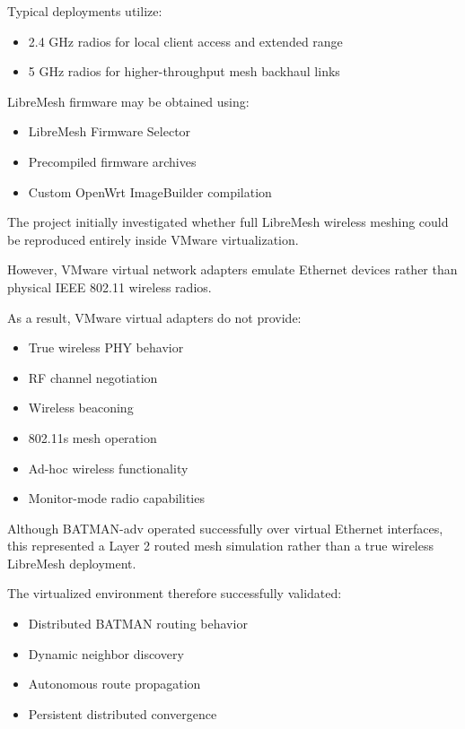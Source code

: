 \documentclass[conference]{IEEEtran}
\begin{document}
Typical deployments utilize:

\begin{itemize}
    \item 2.4 GHz radios for local client access and extended range
    \item 5 GHz radios for higher-throughput mesh backhaul links
\end{itemize}

LibreMesh firmware may be obtained using:

\begin{itemize}
    \item LibreMesh Firmware Selector
    \item Precompiled firmware archives
    \item Custom OpenWrt ImageBuilder compilation
\end{itemize}

The project initially investigated whether full LibreMesh wireless meshing could be reproduced entirely inside VMware virtualization.

However, VMware virtual network adapters emulate Ethernet devices rather than physical IEEE 802.11 wireless radios.

As a result, VMware virtual adapters do not provide:

\begin{itemize}
    \item True wireless PHY behavior
    \item RF channel negotiation
    \item Wireless beaconing
    \item 802.11s mesh operation
    \item Ad-hoc wireless functionality
    \item Monitor-mode radio capabilities
\end{itemize}

Although BATMAN-adv operated successfully over virtual Ethernet interfaces, this represented a Layer 2 routed mesh simulation rather than a true wireless LibreMesh deployment.

The virtualized environment therefore successfully validated:

\begin{itemize}
    \item Distributed BATMAN routing behavior
    \item Dynamic neighbor discovery
    \item Autonomous route propagation
    \item Persistent distributed convergence
\end{itemize}
\end{document}
